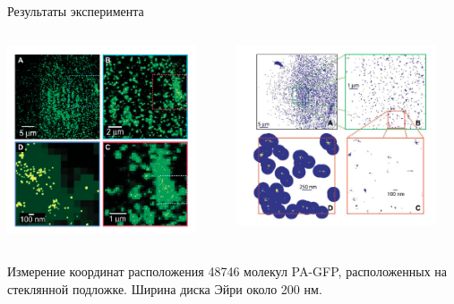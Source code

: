\documentclass[9pt, compress, xcolor=table]{beamer}
\begin{document}
\begin{frame}{Результаты эксперимента}
\begin{columns}[c]
\column{6.5cm}
\begin{center}
\includegraphics[width=0.9\textwidth]{lm9}
\end{center}
\column{6.5cm}
\begin{center}
\includegraphics[width=0.9\textwidth]{lm10}
\end{center}
\end{columns}

Измерение координат расположения 48746 молекул PA-GFP, расположенных на стеклянной подложке. Ширина диска Эйри около 200 нм.
\end{frame}
\end{document}
